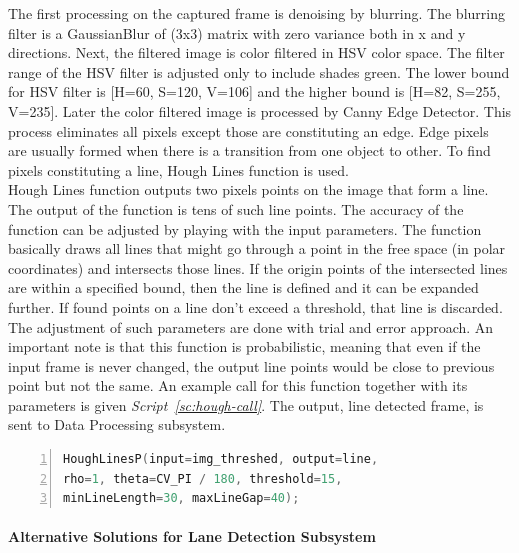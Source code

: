 \documentclass[a4paper,12pt]{article}
\begin{document}
	The first processing on the captured frame is denoising by blurring. The blurring filter is a GaussianBlur of (3x3) matrix with zero variance both in x and y directions. Next, the filtered image is color filtered in HSV color space. The filter range of the HSV filter is adjusted only to include shades green. The lower bound for HSV filter is [H=60, S=120, V=106] and the higher bound is [H=82, S=255, V=235]. Later the color filtered image is processed by Canny Edge Detector. This process eliminates all pixels except those are constituting an edge. Edge pixels are usually formed when there is a transition from one object to other. To find pixels constituting a line, Hough Lines function is used.\\
	
	Hough Lines function outputs two pixels points on the image that form a line. The output of the function is tens of such line points. The accuracy of the function can be adjusted by playing with the input parameters. The function basically draws all lines that might go through a point in the free space (in polar coordinates) and intersects those lines. If the origin points of the intersected lines are within a specified bound, then the line is defined and it can be expanded further. If found points on a line don't exceed a threshold, that line is discarded. The adjustment of such parameters are done with trial and error approach. An important note is that this function is probabilistic, meaning that even if the input frame is never changed, the output line points would be close to previous point but not the same. An example call for this function together with its parameters is given \textit{Script~\ref{sc:hough-call}}. The output, line detected frame, is sent to Data Processing subsystem.
		\begin{lstlisting}[language=C++,float=h,numbers=left,frame=single,caption=Hough Lines Function with its Parameters, captionpos=b, label=sc:hough-call]
HoughLinesP(input=img_threshed, output=line,
rho=1, theta=CV_PI / 180, threshold=15, 
minLineLength=30, maxLineGap=40);
	\end{lstlisting}
	
	\paragraph{Alternative Solutions for Lane Detection Subsystem}\label{para:alt_sol_lane_detect}
	
\end{document}
